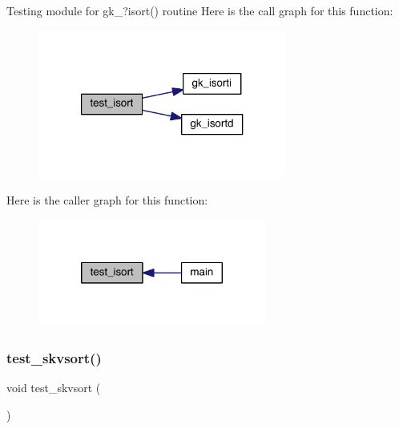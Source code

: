Testing module for gk\+\_\+?isort() routine Here is the call graph for this function\+:\nopagebreak
\begin{figure}[H]
\begin{center}
\leavevmode
\includegraphics[width=232pt]{a00152_a8de21ffeb988c6322635a778ecdd4066_cgraph}
\end{center}
\end{figure}
Here is the caller graph for this function\+:\nopagebreak
\begin{figure}[H]
\begin{center}
\leavevmode
\includegraphics[width=212pt]{a00152_a8de21ffeb988c6322635a778ecdd4066_icgraph}
\end{center}
\end{figure}
\mbox{\label{a00152_ae2471bde9a7e9419d330392c2e2b35fd}} 
\subsubsection{\texorpdfstring{test\+\_\+skvsort()}{test\_skvsort()}}
{\footnotesize\ttfamily void test\+\_\+skvsort (\begin{DoxyParamCaption}{ }\end{DoxyParamCaption})}

